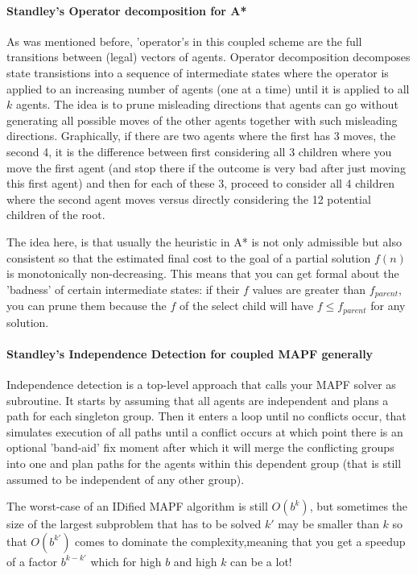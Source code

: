 \documentclass[a4paper,10pt,english]{article}
\begin{document}
	\paragraph{Standley's Operator decomposition for A*}
	As was mentioned before, 'operator's in this coupled scheme are the full transitions between (legal) vectors of agents. Operator decomposition\cite{standley2010} decomposes state transistions into a sequence of intermediate states where the operator is applied to an increasing number of agents (one at a time) until it is applied to all $k$ agents. The idea is to prune misleading directions that agents can go without generating all possible moves of the other agents together with such misleading directions. Graphically, if there are two agents where the first has 3 moves, the second 4, it is the difference between first considering all 3 children where you move the first agent (and stop there if the outcome is very bad after just moving this first agent) and then for each of these 3, proceed to consider all 4 children where the second agent moves versus directly considering the 12 potential children of the root.
	
	The idea here, is that usually the heuristic in A* is not only admissible but also consistent so that the estimated final cost to the goal of a partial solution $f(n)$ is monotonically non-decreasing. This means that you can get formal about the 'badness' of certain intermediate states: if their $f$ values are greater than $f_{parent}$, you can prune them because the $f$ of the select child will have $f\leq f_{parent}$ for any solution.
	\paragraph{Standley's Independence Detection for coupled MAPF generally}
	Independence detection is a top-level approach that calls your MAPF solver as subroutine. It starts by assuming that all agents are independent and plans a path for each singleton group. Then it enters a loop until no conflicts occur, that simulates execution of all paths until a conflict occurs at which point there is an optional 'band-aid' fix moment after which it will merge the conflicting groups into one and plan paths for the agents within this dependent group (that is still assumed to be independent of any other group).
	
	The worst-case of an IDified MAPF algorithm is still $O(b^k)$, but sometimes the size of the largest subproblem that has to be solved $k'$ may be smaller than $k$ so that $O(b^{k'})$ comes to dominate the complexity,meaning that you get a speedup of a factor $b^{k - k'}$ which for high $b$ and high $k$ can be a lot!
	
\end{document}
